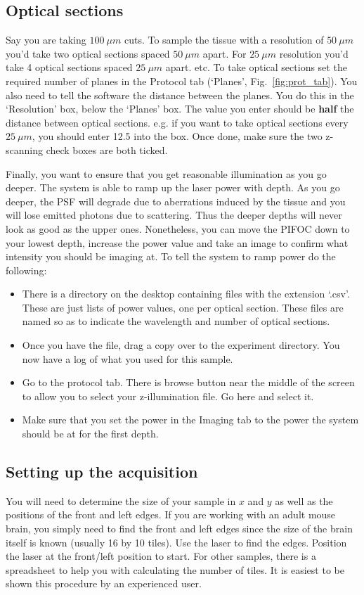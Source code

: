 \documentclass[paper=a4, fontsize=11pt]{scrartcl} %
\numberwithin{equation}{section} %
\numberwithin{figure}{section} %
\numberwithin{table}{section} %
\begin{document}
\subsection{Optical sections}
Say you are taking $100~\mu m$ cuts. 
To sample the tissue with a resolution of $50~\mu m$ you'd take two optical sections spaced $50~\mu m$ apart. 
For $25~\mu m$ resolution you'd take 4 optical sections spaced $25~\mu m$ apart. etc. 
To take optical sections set the required number of planes in the Protocol tab (`Planes', Fig.~\ref{fig:prot_tab}). 
You also need to tell the software the distance between the planes. 
You do this in the `Resolution' box, below the `Planes' box. 
The value you enter should be \textbf{half} the distance between optical sections. 
e.g. if you want to take optical sections every $25~\mu m$, you should enter 12.5 into the box.
Once done, make sure the two z-scanning check boxes are both ticked. 

Finally, you want to ensure that you get reasonable illumination as you go deeper. 
The system is able to ramp up the laser power with depth. 
As you go deeper, the PSF will degrade due to aberrations induced by the tissue and you will lose emitted photons due to scattering.
Thus the deeper depths will never look as good as the upper ones.
Nonetheless, you can move the PIFOC down to your lowest depth, increase the power value and take an image to confirm what intensity you should be imaging at. 
To tell the system to ramp power do the following:
\begin{itemize}
\item There is a directory on the desktop containing files with the extension `.csv'. 
These are just lists of power values, one per optical section. 
These files are named so as to indicate the wavelength and number of optical sections. 
\item Once you have the file, drag a copy over to the experiment directory. 
You now have a log of what you used for this sample. 
\item Go to the protocol tab. There is browse button near the middle of the screen to allow you to select your z-illumination file. Go here and select it. 
\item Make sure that you set the power in the Imaging tab to the power the system should be at for the first depth. 
\end{itemize}


\clearpage


\subsection{Setting up the acquisition}
You will need to determine the size of your sample in $x$ and $y$ as well as the positions of the front and left edges. 
If you are working with an adult mouse brain, you simply need to find the front and left edges since the size of the brain itself is known (usually 16 by 10 tiles). 
Use the laser to find the edges. 
Position the laser at the front/left position to start. 
For other samples, there is a spreadsheet to help you with calculating the number of tiles. 
It is easiest to be shown this procedure by an experienced user.
\end{document}
